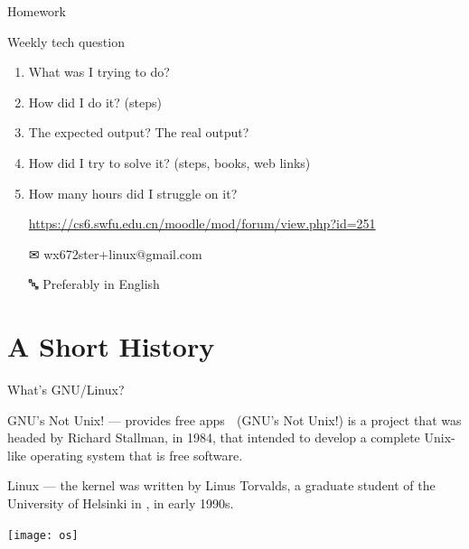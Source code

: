 \begin{frame}{Homework}
  \begin{block}{Weekly tech question}
    \begin{enumerate}
    \item What was I trying to do?
    \item How did I do it? (steps)
    \item The expected output? The real output?
    \item How did I try to solve it? (steps, books, web links)
    \item How many hours did I struggle on it?
    \end{enumerate}
  \end{block}
  \begin{itemize}
  \item[\moodle]
    \url{https://cs6.swfu.edu.cn/moodle/mod/forum/view.php?id=251}
  \item[\Large\dejavu ✉] \alert{\ttfamily wx672ster+linux@gmail.com}
  \item[🔤] Preferably in English
  \end{itemize}
\end{frame}

\section[History]{A Short History}

\begin{frame}{What's GNU/Linux?}
  \begin{minipage}{.6\textwidth}
    \begin{block}{GNU's Not Unix! --- provides free apps}
      {\Huge\nerd } (GNU's Not Unix!) is a project that was headed by Richard Stallman,
      in 1984, that intended to develop a complete Unix-like operating system that is free
      software.
    \end{block}
    \begin{block}{Linux --- the kernel}
      {\LARGE\linux\;} was written by Linus Torvalds, a graduate student of the University of
      Helsinki in , in early 1990s.%
    \end{block}
  \end{minipage}\quad
  \begin{minipage}{.35\textwidth}
    \centering
    \texttt{[image: os]}
  \end{minipage}
\end{frame}

